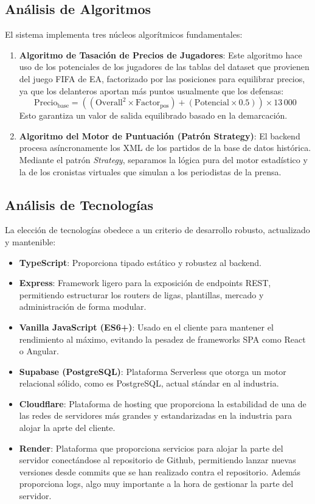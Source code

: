 \subsection{Análisis de Algoritmos}
El sistema implementa tres núcleos algorítmicos fundamentales:
\begin{enumerate}
    \item \textbf{Algoritmo de Tasación de Precios de Jugadores}:
    Este algoritmo hace uso de los potenciales de los jugadores de las tablas del dataset que provienen del juego FIFA de EA, factorizado por las posiciones para equilibrar precios, ya que los delanteros aportan más puntos usualmente que los defensas:
    \[ \text{Precio}_{\text{base}} = \left( (\text{Overall}^2 \times \text{Factor}_{\text{pos}}) + (\text{Potencial} \times 0.5) \right) \times 13\,000 \]
    Esto garantiza un valor de salida equilibrado basado en la demarcación.
    \item \textbf{Algoritmo del Motor de Puntuación (Patrón Strategy)}:
    El backend procesa asíncronamente los XML de los partidos de la base de datos histórica. Mediante el patrón \textit{Strategy}, separamos la lógica pura del motor estadístico y la de los cronistas virtuales que simulan a los periodistas de la prensa.
\end{enumerate}

\subsection{Análisis de Tecnologías}
La elección de tecnologías obedece a un criterio de desarrollo robusto, actualizado y mantenible:
\begin{itemize}
    \item \textbf{TypeScript}: Proporciona tipado estático y robustez al backend.
    \item \textbf{Express}: Framework ligero para la exposición de endpoints REST, permitiendo estructurar los routers de ligas, plantillas, mercado y administración de forma modular.
    \item \textbf{Vanilla JavaScript (ES6+)}: Usado en el cliente para mantener el rendimiento al máximo, evitando la pesadez de frameworks SPA como React o Angular.
    \item \textbf{Supabase (PostgreSQL)}: Plataforma Serverless que otorga un motor relacional sólido, como es PostgreSQL, actual stándar en al industria.
    \item \textbf{Cloudflare}: Plataforma de hosting que proporciona la estabilidad de una de las redes de servidores más grandes y estandarizadas en la industria para alojar la aprte del cliente.
    \item \textbf{Render}: Plataforma que proporciona servicios para alojar la parte del servidor conectándose al repositorio de Github, permitiendo lanzar nuevas versiones desde commits que se han realizado contra el repositorio. Además proporciona logs, algo muy importante a la hora de gestionar la parte del servidor.
\end{itemize}

